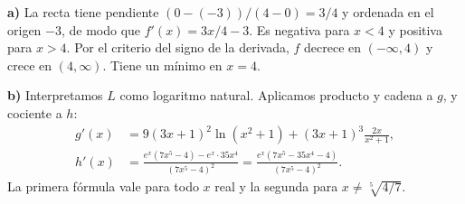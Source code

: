 \textbf{a)} La recta tiene pendiente $(0-(-3))/(4-0)=3/4$ y ordenada en el origen $-3$, de modo que $f'(x)=3x/4-3$. Es negativa para $x<4$ y positiva para $x>4$. Por el criterio del signo de la derivada, $f$ decrece en $(-\infty,4)$ y crece en $(4,\infty)$. Tiene un mínimo en $x=4$.

\textbf{b)} Interpretamos $L$ como logaritmo natural. Aplicamos producto y cadena a $g$, y cociente a $h$:
\[
 \begin{aligned}
 g'(x)&=9(3x+1)^2\ln(x^2+1)+(3x+1)^3\frac{2x}{x^2+1},\\
 h'(x)&=\frac{e^x(7x^5-4)-e^x\cdot35x^4}{(7x^5-4)^2}
      =\frac{e^x(7x^5-35x^4-4)}{(7x^5-4)^2}.
 \end{aligned}
\]
La primera fórmula vale para todo $x$ real y la segunda para $x\ne\sqrt[5]{4/7}$.
